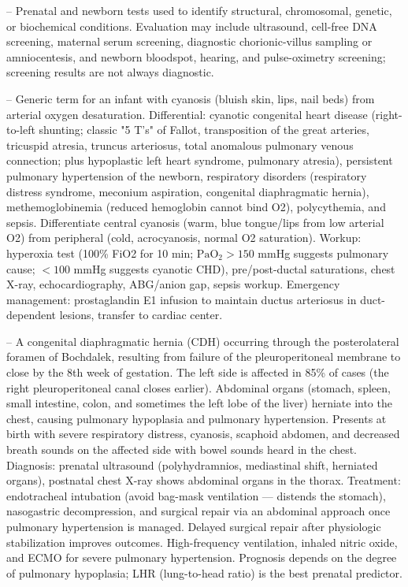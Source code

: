 -- Prenatal and newborn tests used to identify structural, chromosomal, genetic, or biochemical conditions. Evaluation may include ultrasound, cell-free DNA screening, maternal serum screening, diagnostic chorionic-villus sampling or amniocentesis, and newborn bloodspot, hearing, and pulse-oximetry screening; screening results are not always diagnostic.

-- Generic term for an infant with cyanosis (bluish skin, lips, nail beds) from arterial oxygen desaturation. Differential: cyanotic congenital heart disease (right-to-left shunting; classic "5 T's" of Fallot, transposition of the great arteries, tricuspid atresia, truncus arteriosus, total anomalous pulmonary venous connection; plus hypoplastic left heart syndrome, pulmonary atresia), persistent pulmonary hypertension of the newborn, respiratory disorders (respiratory distress syndrome, meconium aspiration, congenital diaphragmatic hernia), methemoglobinemia (reduced hemoglobin cannot bind O2), polycythemia, and sepsis. Differentiate central cyanosis (warm, blue tongue/lips from low arterial O2) from peripheral (cold, acrocyanosis, normal O2 saturation). Workup: hyperoxia test (100\% FiO2 for 10 min; $\mathrm{PaO_2} > 150$ mmHg suggests pulmonary cause; $< 100$ mmHg suggests cyanotic CHD), pre/post-ductal saturations, chest X-ray, echocardiography, ABG/anion gap, sepsis workup. Emergency management: prostaglandin E1 infusion to maintain ductus arteriosus in duct-dependent lesions, transfer to cardiac center.

-- A congenital diaphragmatic hernia (CDH) occurring through the posterolateral foramen of Bochdalek, resulting from failure of the pleuroperitoneal membrane to close by the 8th week of gestation. The left side is affected in 85\% of cases (the right pleuroperitoneal canal closes earlier). Abdominal organs (stomach, spleen, small intestine, colon, and sometimes the left lobe of the liver) herniate into the chest, causing pulmonary hypoplasia and pulmonary hypertension. Presents at birth with severe respiratory distress, cyanosis, scaphoid abdomen, and decreased breath sounds on the affected side with bowel sounds heard in the chest. Diagnosis: prenatal ultrasound (polyhydramnios, mediastinal shift, herniated organs), postnatal chest X-ray shows abdominal organs in the thorax. Treatment: endotracheal intubation (avoid bag-mask ventilation — distends the stomach), nasogastric decompression, and surgical repair via an abdominal approach once pulmonary hypertension is managed. Delayed surgical repair after physiologic stabilization improves outcomes. High-frequency ventilation, inhaled nitric oxide, and ECMO for severe pulmonary hypertension. Prognosis depends on the degree of pulmonary hypoplasia; LHR (lung-to-head ratio) is the best prenatal predictor.


